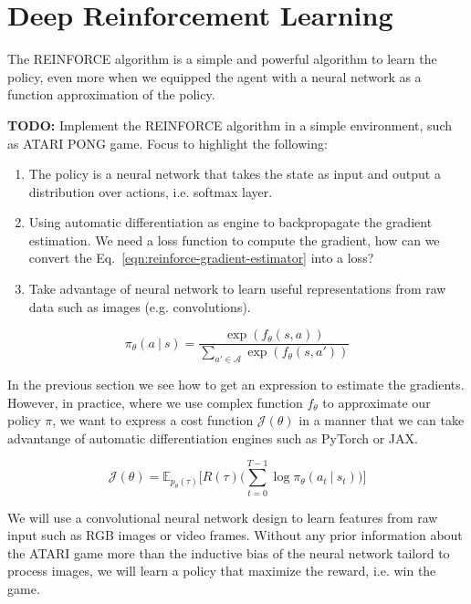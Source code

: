 \section{Deep Reinforcement Learning}

The REINFORCE algorithm is a simple and powerful algorithm to learn the policy,
even more when we equipped the agent with a neural network as a function 
approximation of the policy. 

\textbf{TODO:} Implement the REINFORCE algorithm in a simple environment, such as ATARI PONG game. Focus to highlight the following:

\begin{enumerate}
    \item The policy is a neural network that takes the state as input and output a distribution over actions, i.e. softmax layer.  
    \item Using automatic differentiation as engine to backpropagate the gradient estimation. We need a loss function to compute the gradient, how
    can we convert the Eq.~\ref{eqn:reinforce-gradient-estimator} into a loss?
    \item Take advantage of neural network to learn useful representations from raw data such as images (e.g. convolutions).
\end{enumerate}

\begin{equation}\label{eqn:neural-softmax-policies}
    \pi_{\theta}(a~|~s) = \frac{\exp(f_{\theta}(s, a))}{\sum_{a'\in\mathcal{A}}\exp(f_{\theta}(s, a'))}
\end{equation}

In the previous section we see how to get an expression to estimate the gradients. However, in practice, where we use complex function
$f_{\theta}$ to approximate our policy $\pi$, we want to express a cost
function $\mathcal{J}(\theta)$ in a manner that we can take advantange of 
automatic differentiation engines such as PyTorch or JAX.

\begin{equation}\label{eqn:reinforce-gradient-estimator-cost}
    \mathcal{J}(\theta) = \mathbb{E}_{p_{\theta}(\tau)}\bigg[R(\tau)\bigg(\sum_{t=0}^{T-1} \log \pi_{\theta} (a_t~|~s_t) \bigg)\bigg] 
\end{equation}

We will use a convolutional neural network design to learn features from
raw input such as RGB images or video frames. Without any prior information about the ATARI game more than the inductive bias of the neural network tailord to process images, we will learn a policy that maximize the reward, i.e. win
the game.

